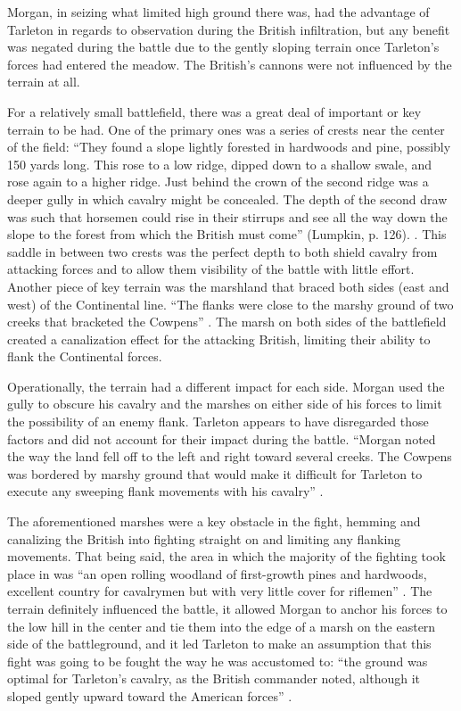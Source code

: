 Morgan, in seizing what limited high ground there was, had the advantage of
Tarleton in regards to observation during the British infiltration, but any
benefit was negated during the battle due to the gently sloping terrain once
Tarleton’s forces had entered the meadow.  The British’s cannons were not
influenced by the terrain at all. 

For a relatively small battlefield, there was a great deal of important or key
terrain to be had.  One of the primary ones was a series of crests near the
center of the field: “They found a slope lightly forested in hardwoods and pine,
possibly 150 yards long. This rose to a low ridge, dipped down to a shallow
swale, and rose again to a higher ridge.  Just behind the crown of the second
ridge was a deeper gully in which cavalry might be concealed.  The depth of the
second draw was such that horsemen could rise in their stirrups and see all the
way down the slope to the forest from which the British must come” (Lumpkin, p.
126). \cite[126]{lumpkin_savannah_1981}.
This saddle in between two crests was the perfect depth to both shield
cavalry from attacking forces and to allow them visibility of the battle with
little effort. Another piece of key terrain was the marshland that braced both
sides (east and west) of the Continental line.  ``The flanks were close to the
marshy ground of two creeks that bracketed the Cowpens'' \cite[327]{stephenson_patriot_2007}.
The marsh on both sides of the battlefield created a canalization effect for the
attacking British, limiting their ability to flank the Continental forces.  

Operationally, the terrain had a different impact for each side.  Morgan used
the gully to obscure his cavalry and the marshes on either side of his forces to
limit the possibility of an enemy flank.  Tarleton appears to have disregarded
those factors and did not account for their impact during the battle.  “Morgan
noted the way the land fell off to the left and right toward several creeks.
The Cowpens was bordered by marshy ground that would make it difficult for
Tarleton to execute any sweeping flank movements with his cavalry” \cite[45]{fleming_cowpens_1988}.

The aforementioned marshes were a key obstacle in the fight, hemming and
canalizing the British into fighting straight on and limiting any flanking
movements.  That being said, the area in which the majority of the fighting took
place in was ``an open rolling woodland of first-growth pines and hardwoods,
excellent country for cavalrymen but with very little cover for riflemen''
\cite[124]{lumpkin_savannah_1981}.  The terrain definitely influenced the battle, it allowed
Morgan to anchor his forces to the low hill in the center and tie them into the
edge of a marsh on the eastern side of the battleground, and it led Tarleton to
make an assumption that this fight was going to be fought the way he was
accustomed to: ``the ground was optimal for Tarleton's cavalry, as the British
commander noted, although it sloped gently upward toward the American forces''
\cite[46]{moncure_cowpens_1996}.

